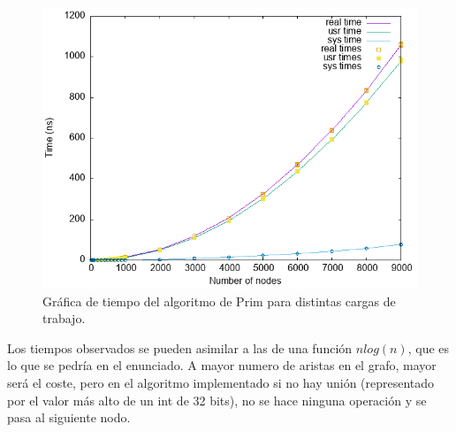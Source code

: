 \begin{figure}[H]
      \includegraphics[width = \textwidth]{./images/prim-plot.png}
      \caption{Gráfica de tiempo del algoritmo de Prim para distintas cargas de trabajo.}
      \label{fig:prim-plot}
  \end{figure}


Los tiempos observados se pueden asimilar a las de una función $nlog(n)$, que es lo que se pedría en el enunciado.
A mayor numero de aristas en el grafo, mayor será el coste, pero en el algoritmo implementado si no hay unión (representado por el valor más alto de un int de 32 bits), no se hace ninguna operación y se pasa al siguiente nodo.
